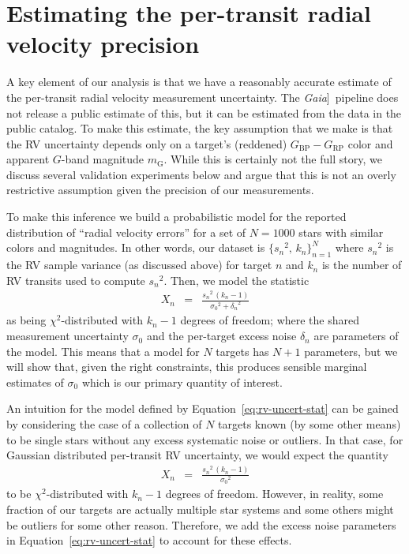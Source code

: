 \documentclass[modern, letterpaper]{aastex63}
\newcommand{\project}[1]{\textsl{#1}}
\newcommand{\Gaia}{\project{Gaia}]}
\begin{document}
\section{Estimating the per-transit radial velocity precision}

A key element of our analysis is that we have a reasonably accurate estimate of the per-transit radial velocity measurement uncertainty.
The \Gaia\ pipeline does not release a public estimate of this, but it can be estimated from the data in the public catalog.
To make this estimate, the key assumption that we make is that the RV uncertainty depends only on a target's (reddened) $G_\mathrm{BP} - G_\mathrm{RP}$ color and apparent $G$-band magnitude $m_\mathrm{G}$.
While this is certainly not the full story, we discuss several validation experiments below and argue that this is not an overly restrictive assumption given the precision of our measurements.

To make this inference we build a probabilistic model for the reported distribution of ``radial velocity errors'' for a set of $N = 1000$ stars with similar colors and magnitudes.
In other words, our dataset is $\{{s_n}^2,\,k_n\}_{n=1}^N$ where ${s_n}^2$ is the RV sample variance (as discussed above) for target $n$ and $k_n$ is the number of RV transits used to compute ${s_n}^2$.
Then, we model the statistic
\begin{eqnarray}
  \label{eq:rv-uncert-stat}
  X_n &=& \frac{{s_n}^2\,(k_n - 1)}{{\sigma_0}^2 + {\delta_n}^2}
\end{eqnarray}
as being $\chi^2$-distributed with $k_n - 1$ degrees of freedom; where the shared measurement uncertainty $\sigma_0$ and the per-target excess noise $\delta_n$ are parameters of the model.
This means that a model for $N$ targets has $N + 1$ parameters, but we will show that, given the right constraints, this produces sensible marginal estimates of $\sigma_0$ which is our primary quantity of interest.

An intuition for the model defined by Equation~\ref{eq:rv-uncert-stat} can be gained by considering the case of a collection of $N$ targets known (by some other means) to be single stars without any excess systematic noise or outliers.
In that case, for Gaussian distributed per-transit RV uncertainty, we would expect the quantity
\begin{eqnarray}
  \label{eq:rv-uncert-stat-basic}
  X_n &=& \frac{{s_n}^2\,(k_n - 1)}{{\sigma_0}^2}
\end{eqnarray}
to be $\chi^2$-distributed with $k_n - 1$ degrees of freedom.
However, in reality, some fraction of our targets are actually multiple star systems and some others might be outliers for some other reason.
Therefore, we add the excess noise parameters in Equation~\ref{eq:rv-uncert-stat} to account for these effects.
\end{document}
